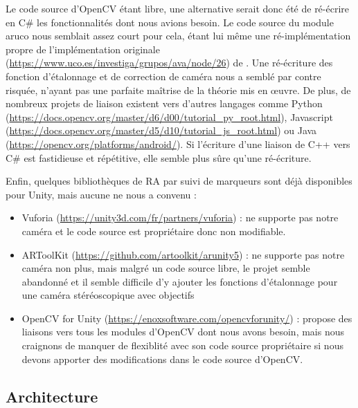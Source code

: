 Le code source d'OpenCV étant libre, une alternative serait donc été de ré-écrire en C\# les fonctionnalités dont nous avions besoin. Le code source du module aruco nous semblait assez court pour cela, étant lui même une ré-implémentation propre de l'implémentation originale (\url{https://www.uco.es/investiga/grupos/ava/node/26}) de \cite{Garrido-Jurado2014}. Une ré-écriture des fonction d'étalonnage et de correction de caméra nous a semblé par contre risquée, n'ayant pas une parfaite maîtrise de la théorie mis en \oe uvre. De plus, de nombreux projets de liaison existent vers d'autres langages comme Python (\url{https://docs.opencv.org/master/d6/d00/tutorial_py_root.html}), Javascript (\url{https://docs.opencv.org/master/d5/d10/tutorial_js_root.html}) ou Java (\url{https://opencv.org/platforms/android/}). Si l'écriture d'une liaison de C++ vers C\# est fastidieuse et répétitive, elle semble plus sûre qu'une ré-écriture.

Enfin, quelques bibliothèques de RA par suivi de marqueurs sont déjà disponibles pour Unity, mais aucune ne nous a convenu :
\begin{itemize}
  \item Vuforia (\url{https://unity3d.com/fr/partners/vuforia}) : ne supporte pas notre caméra et le code source est propriétaire donc non modifiable.
  \item ARToolKit (\url{https://github.com/artoolkit/arunity5}) : ne supporte pas notre caméra non plus, mais malgré un code source libre, le projet semble abandonné et il semble difficile d'y ajouter les fonctions d'étalonnage pour une caméra stéréoscopique avec objectifs  
  \item OpenCV for Unity (\url{https://enoxsoftware.com/opencvforunity/}) : propose des liaisons vers tous les modules d'OpenCV dont nous avons besoin, mais nous craignons de manquer de flexiblité avec son code source propriétaire si nous devons apporter des modifications dans le code source d'OpenCV.
\end{itemize}

\subsection{Architecture}
\label{subsec:aruco_unity_architecture}

